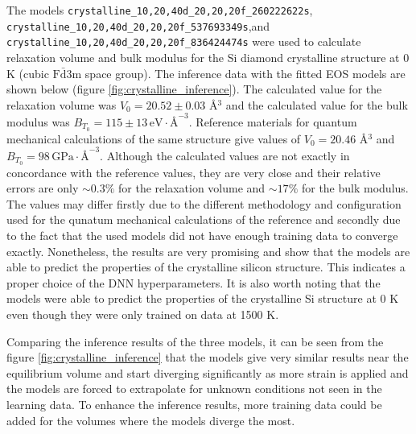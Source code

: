 The models \texttt{crystalline\_10,20,40d\_20,20,20f\_260222622s},\linebreak
\texttt{crystalline\_10,20,40d\_20,20,20f\_537693349s},\linebreak and
\texttt{crystalline\_10,20,40d\_20,20,20f\_836424474s} were used to calculate
relaxation volume and bulk modulus for the Si diamond crystalline structure
at 0 K (cubic $\mathrm{F}\bar{\mathrm{d}}\mathrm{3m}$ space group). The
inference data with the fitted EOS models are shown below (figure
\ref{fig:crystalline_inference}). The calculated value for the relaxation
volume was $V_0 = 20.52 \pm 0.03$ \AA$^3$ and the calculated value for the
bulk modulus was
$B_{T_0} = 115 \pm 13 \, \mathrm{eV} \cdot \text{\AA}^{-3}$. Reference
materials for quantum mechanical calculations of the same structure give
values of $V_0 = 20.46$ \AA$^3$ and
$B_{T_0} = 98 \, \mathrm{GPa} \cdot \text{\AA}^{-3}$\cite{osti_1190959}.
Although the calculated values are not exactly in concordance with the
reference values, they are very close and their relative errors are
only $\sim 0.3\%$ for the relaxation volume and $\sim 17 \%$ for the bulk
modulus. The values may differ firstly due to the different methodology and
configuration used for the qunatum mechanical calculations of the reference
and secondly due to the fact that the used models did not have enough training
data to converge exactly. Nonetheless, the results are very promising and show
that the models are able to predict the properties of the crystalline silicon
structure. This indicates a proper choice of the DNN hyperparameters. It is
also worth noting that the models were able to predict the properties of the
crystalline Si structure at 0 K even though they were only trained on data at
1500 K.

Comparing the inference results of the three models, it can be seen from the
figure \ref{fig:crystalline_inference} that the models give very similar
results near the equilibrium volume and start diverging significantly as more
strain is applied and the models are forced to extrapolate for unknown
conditions not seen in the learning data. To enhance the inference results,
more training data could be added for the volumes where the models diverge the
most.

